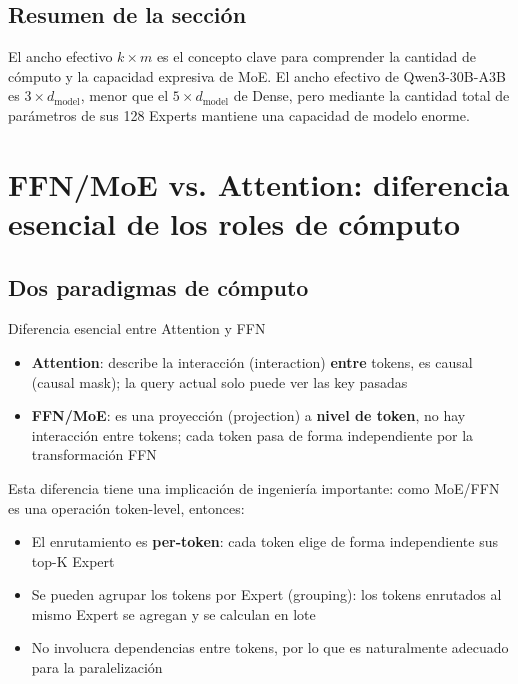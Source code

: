 \documentclass[a4paper]{article}
\begin{document}
\subsection{Resumen de la sección}

El ancho efectivo $k \times m$ es el concepto clave para comprender la cantidad de cómputo y la capacidad expresiva de MoE. El ancho efectivo de Qwen3-30B-A3B es $3 \times d_{\text{model}}$, menor que el $5 \times d_{\text{model}}$ de Dense, pero mediante la cantidad total de parámetros de sus 128 Experts mantiene una capacidad de modelo enorme.

\section{FFN/MoE vs. Attention: diferencia esencial de los roles de cómputo}

\subsection{Dos paradigmas de cómputo}

\begin{importantbox}{Diferencia esencial entre Attention y FFN}
\begin{itemize}
  \item \textbf{Attention}: describe la interacción (interaction) \textbf{entre} tokens, es causal (causal mask); la query actual solo puede ver las key pasadas
  \item \textbf{FFN/MoE}: es una proyección (projection) a \textbf{nivel de token}, no hay interacción entre tokens; cada token pasa de forma independiente por la transformación FFN
\end{itemize}
\end{importantbox}

Esta diferencia tiene una implicación de ingeniería importante: como MoE/FFN es una operación token-level, entonces:
\begin{itemize}
  \item El enrutamiento es \textbf{per-token}: cada token elige de forma independiente sus top-K Expert
  \item Se pueden agrupar los tokens por Expert (grouping): los tokens enrutados al mismo Expert se agregan y se calculan en lote
  \item No involucra dependencias entre tokens, por lo que es naturalmente adecuado para la paralelización
\end{itemize}
\end{document}

